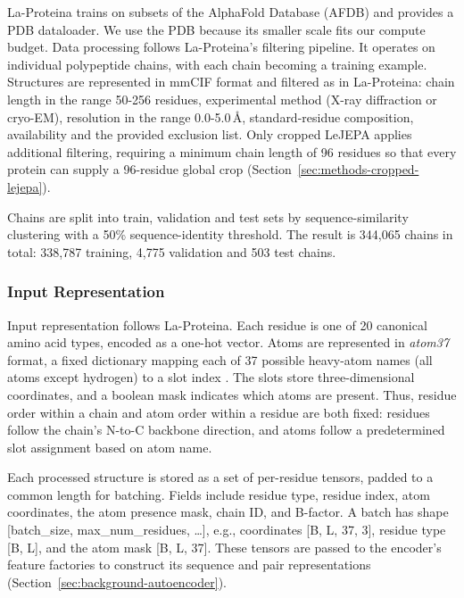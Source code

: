 La-Proteina trains on subsets of the AlphaFold Database (AFDB) \citep{DBLP:journals/nar/VaradiADNNYYSWL22,la-proteina} and provides a PDB dataloader. We use the PDB because its smaller scale fits our compute budget.
Data processing follows La-Proteina's filtering pipeline. It operates on individual polypeptide chains, with each chain becoming a training example. Structures are represented in mmCIF format and filtered as in La-Proteina: chain length in the range 50-256 residues, experimental method (X-ray diffraction or cryo-EM), resolution in the range 0.0-5.0\,\AA, standard-residue composition, availability and the provided exclusion list. Only cropped LeJEPA applies additional filtering, requiring a minimum chain length of 96 residues so that every protein can supply a 96-residue global crop (Section~\ref{sec:methods-cropped-lejepa}).

Chains are split into train, validation and test sets by sequence-similarity clustering with a 50\% sequence-identity threshold.
The result is 344{,}065 chains in total: 338{,}787 training, 4{,}775 validation and 503 test chains.

\subsubsection{Input Representation}

Input representation follows La-Proteina. Each residue is one of 20 canonical amino acid types, encoded as a one-hot vector. Atoms are represented in \emph{atom37} format, a fixed dictionary mapping each of 37 possible heavy-atom names (all atoms except hydrogen) to a slot index \citep{ahdritz2024openfold}. The slots store three-dimensional coordinates, and a boolean mask indicates which atoms are present. Thus, residue order within a chain and atom order within a residue are both fixed: residues follow the chain's N-to-C backbone direction, and atoms follow a predetermined slot assignment based on atom name.

Each processed structure is stored as a set of per-residue tensors, padded
to a common length for batching. Fields include residue type, residue index, atom
coordinates, the atom presence mask, chain ID, and B-factor. A batch has shape
[batch\_size, max\_num\_residues, \dots], e.g., coordinates [B, L, 37, 3], residue type
[B, L], and the atom mask [B, L, 37]. These tensors are passed to the encoder's feature factories to construct its sequence and pair representations (Section~\ref{sec:background-autoencoder}).

